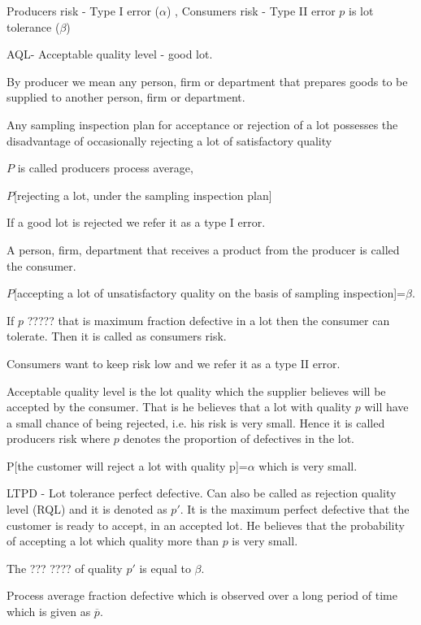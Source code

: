 \documentclass[oneside,11pt,pdftex]{book}%
\numberwithin{equation}{section}
\numberwithin{section}{chapter}
\numberwithin{equation}{chapter}
\begin{document}
Producers risk - Type I error ($ \alpha  $)
, Consumers risk - Type II error $ p $ is lot tolerance ($ \beta $)

AQL- Acceptable quality level - good lot.


By producer we mean any person, firm or department that prepares goods to be supplied to another person, firm or department.

Any sampling inspection plan for acceptance or rejection of a lot possesses the disadvantage of occasionally rejecting a lot of satisfactory quality

$ P $ is called producers process average,

$ P $[rejecting a lot, under the sampling inspection plan]

If a good lot is rejected we refer it as a type I error.

A person, firm, department that receives a product from the producer is called the consumer.

$ P $[accepting a lot of unsatisfactory quality on the basis of sampling inspection]=$ \beta $.

If $ p $ ????? that is maximum fraction defective in a lot then the consumer can tolerate. Then it is called as consumers risk.

Consumers want to keep risk low and we refer it as a type II error.

Acceptable quality level is the lot quality which the supplier believes will be accepted by the consumer. That is he believes that a lot with quality $ p $ will have a small chance of being rejected, i.e. his risk is very small. Hence it is called producers risk where $ p $ denotes the proportion of defectives in the lot.

P[the customer will reject a lot with quality p]=$ \alpha $ which is very small.

LTPD - Lot tolerance perfect defective. Can also be called as rejection quality level (RQL) and it is denoted as $ p' $. It is the maximum perfect defective that the customer is ready to accept, in an accepted lot. He believes that the probability of accepting a lot which quality more than $ p $ is very small.

The ??? ???? of quality $ p' $ is equal to $ \beta  $.

Process average fraction defective which is observed over a long period of time which is given as $ \overline{p} $.

\backmatter
\end{document}
